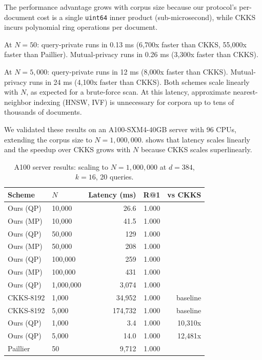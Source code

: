 \documentclass[11pt]{article}
\begin{document}
The performance advantage grows with corpus size because our protocol's per-document cost is a single \texttt{uint64} inner product (sub-microsecond), while CKKS incurs polynomial ring operations per document.

At $N = 50$: query-private runs in 0.13 ms (6{,}700x faster than CKKS, 55{,}000x faster than Paillier). Mutual-privacy runs in 0.26 ms (3{,}300x faster than CKKS).

At $N = 5{,}000$: query-private runs in 12 ms (8{,}000x faster than CKKS). Mutual-privacy runs in 24 ms (4{,}100x faster than CKKS). Both schemes scale linearly with $N$, as expected for a brute-force scan. At this latency, approximate nearest-neighbor indexing (HNSW, IVF) is unnecessary for corpora up to tens of thousands of documents.

We validated these results on an A100-SXM4-40GB server with 96 CPUs, extending the corpus size to $N = 1{,}000{,}000$.  shows that latency scales linearly and the speedup over CKKS grows with $N$ because CKKS scales superlinearly.

\begin{table}[t]
\centering
\caption{A100 server results: scaling to $N = 1{,}000{,}000$ at $d = 384$, $k = 16$, 20 queries.}
\label{tab:a100}
\begin{tabular}{llrrr}
\toprule
Scheme & $N$ & Latency (ms) & R@1 & vs CKKS \\
\midrule
Ours (QP) & 10{,}000 & 26.6 & 1.000 & \\
Ours (MP) & 10{,}000 & 41.5 & 1.000 & \\
\midrule
Ours (QP) & 50{,}000 & 129 & 1.000 & \\
Ours (MP) & 50{,}000 & 208 & 1.000 & \\
\midrule
Ours (QP) & 100{,}000 & 259 & 1.000 & \\
Ours (MP) & 100{,}000 & 431 & 1.000 & \\
\midrule
Ours (QP) & 1{,}000{,}000 & 3{,}074 & 1.000 & \\
\midrule
CKKS-8192 & 1{,}000 & 34{,}952 & 1.000 & baseline \\
CKKS-8192 & 5{,}000 & 174{,}732 & 1.000 & baseline \\
Ours (QP) & 1{,}000 & 3.4 & 1.000 & 10{,}310x \\
Ours (QP) & 5{,}000 & 14.0 & 1.000 & 12{,}481x \\
Paillier & 50 & 9{,}712 & 1.000 & \\
\bottomrule
\end{tabular}
\end{table}
\end{document}
